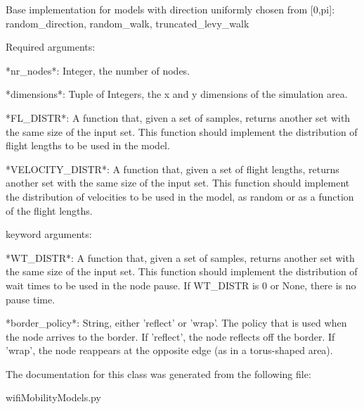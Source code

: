 \begin{DoxyVerb}Base implementation for models with direction uniformly chosen from [0,pi]:
random_direction, random_walk, truncated_levy_walk

Required arguments:

  *nr_nodes*:
    Integer, the number of nodes.
  
  *dimensions*:
    Tuple of Integers, the x and y dimensions of the simulation area.
    
  *FL_DISTR*:
    A function that, given a set of samples, 
     returns another set with the same size of the input set.
    This function should implement the distribution of flight lengths
     to be used in the model.
     
  *VELOCITY_DISTR*:
    A function that, given a set of flight lengths, 
     returns another set with the same size of the input set.
    This function should implement the distribution of velocities
     to be used in the model, as random or as a function of the flight lengths.
  
keyword arguments:

  *WT_DISTR*:
    A function that, given a set of samples, 
     returns another set with the same size of the input set.
    This function should implement the distribution of wait times
     to be used in the node pause.
    If WT_DISTR is 0 or None, there is no pause time.
    
  *border_policy*:
    String, either 'reflect' or 'wrap'. The policy that is used when the node arrives to the border.
    If 'reflect', the node reflects off the border.
    If 'wrap', the node reappears at the opposite edge (as in a torus-shaped area).
\end{DoxyVerb}
 

The documentation for this class was generated from the following file\-:\begin{DoxyCompactItemize}
\item 
wifi\-Mobility\-Models.\-py\end{DoxyCompactItemize}
